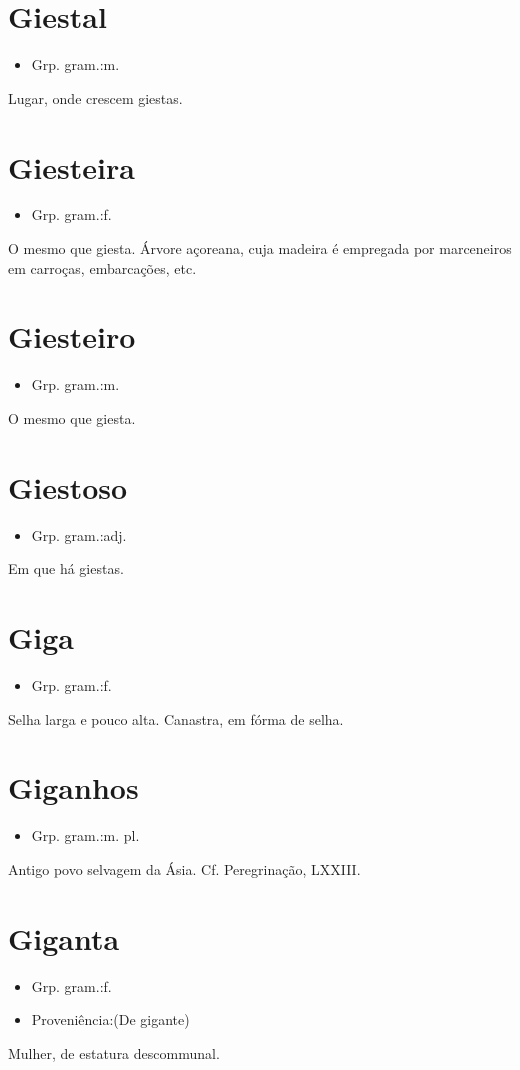 \section{Giestal}
\begin{itemize}
\item {Grp. gram.:m.}
\end{itemize}
Lugar, onde crescem giestas.
\section{Giesteira}
\begin{itemize}
\item {Grp. gram.:f.}
\end{itemize}
O mesmo que \textunderscore giesta\textunderscore .
Árvore açoreana, cuja madeira é empregada por marceneiros em carroças, embarcações, etc.
\section{Giesteiro}
\begin{itemize}
\item {Grp. gram.:m.}
\end{itemize}
O mesmo que \textunderscore giesta\textunderscore .
\section{Giestoso}
\begin{itemize}
\item {Grp. gram.:adj.}
\end{itemize}
Em que há giestas.
\section{Giga}
\begin{itemize}
\item {Grp. gram.:f.}
\end{itemize}
Selha larga e pouco alta.
Canastra, em fórma de selha.
\section{Giganhos}
\begin{itemize}
\item {Grp. gram.:m. pl.}
\end{itemize}
Antigo povo selvagem da Ásia. Cf. \textunderscore Peregrinação\textunderscore , LXXIII.
\section{Giganta}
\begin{itemize}
\item {Grp. gram.:f.}
\end{itemize}
\begin{itemize}
\item {Proveniência:(De \textunderscore gigante\textunderscore )}
\end{itemize}
Mulher, de estatura descommunal.
